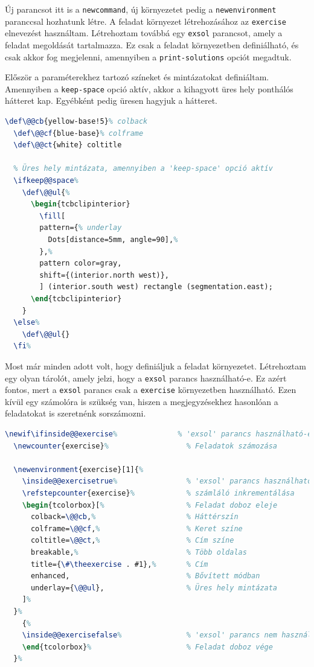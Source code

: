 Új parancsot itt is a \texttt{newcommand}, új környezetet pedig a
\texttt{newenvironment} paranccsal hozhatunk létre. A feladat környezet
létrehozásához az \texttt{exercise} elnevezést használtam. Létrehoztam továbbá
egy \texttt{exsol} parancsot, amely a feladat megoldását tartalmazza. Ez
csak a feladat környezetben definiálható, és csak akkor fog megjelenni,
amennyiben a \texttt{print-solutions} opciót megadtuk.

Először a paraméterekhez tartozó színeket és mintázatokat definiáltam.
Amennyiben a \texttt{keep-space} opció aktív, akkor a kihagyott üres hely
ponthálós hátteret kap. Egyébként pedig üresen hagyjuk a hátteret.

\begin{lstlisting}[language=tex,caption={Konstansok definiálása}]
  \def\@@cb{yellow-base!5}% colback
  \def\@@cf{blue-base}% colframe
  \def\@@ct{white} coltitle

  % Üres hely mintázata, amennyiben a 'keep-space' opció aktív
  \ifkeep@@space%
    \def\@@ul{%
      \begin{tcbclipinterior}
        \fill[
        pattern={% underlay
          Dots[distance=5mm, angle=90],%
        },%
        pattern color=gray,
        shift={(interior.north west)},
        ] (interior.south west) rectangle (segmentation.east);
      \end{tcbclipinterior}
    }
  \else%
    \def\@@ul{}
  \fi%
\end{lstlisting}

Most már minden adott volt, hogy definiáljuk a feladat környezetet. Létrehoztam
egy olyan tárolót, amely jelzi, hogy a \texttt{exsol} parancs használható-e.
Ez azért fontos, mert a \texttt{exsol} parancs csak a \texttt{exercise}
környezetben használható. Ezen kívül egy számolóra is szükség van, hiszen a
megjegyzésekhez hasonlóan a feladatokat is szeretnénk sorszámozni.

\begin{lstlisting}[language=tex,caption={Az \texttt{exercise} környezet}]
  \newif\ifinside@@exercise%              % 'exsol' parancs használható-e?
  \newcounter{exercise}%                  % Feladatok számozása

  \newenvironment{exercise}[1]{%
    \inside@@exercisetrue%                % 'exsol' parancs használható
    \refstepcounter{exercise}%            % számláló inkrementálása
    \begin{tcolorbox}[%                   % Feladat doboz eleje
      colback=\@@cb,%                     % Háttérszín
      colframe=\@@cf,%                    % Keret színe
      coltitle=\@@ct,%                    % Cím színe
      breakable,%                         % Több oldalas
      title={\#\theexercise . #1},%       % Cím
      enhanced,                           % Bővített módban
      underlay={\@@ul},                   % Üres hely mintázata
    ]%
  }%
	{%
    \inside@@exercisefalse%               % 'exsol' parancs nem használható
    \end{tcolorbox}%                      % Feladat doboz vége
  }%
\end{lstlisting}


